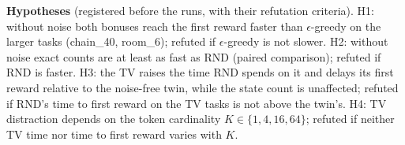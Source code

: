 \textbf{Hypotheses} (registered before the runs, with their refutation criteria). H1: without noise both bonuses reach the first reward faster than $\epsilon$-greedy on the larger tasks (chain\_40, room\_6); refuted if $\epsilon$-greedy is not slower. H2: without noise exact counts are at least as fast as RND (paired comparison); refuted if RND is faster. H3: the TV raises the time RND spends on it and delays its first reward relative to the noise-free twin, while the state count is unaffected; refuted if RND's time to first reward on the TV tasks is not above the twin's. H4: TV distraction depends on the token cardinality $K\in\{1,4,16,64\}$; refuted if neither TV time nor time to first reward varies with $K$.
